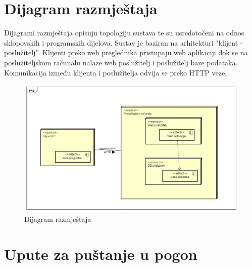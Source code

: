 		
		\section{Dijagram razmještaja}
			
			
			
			Dijagrami razmještaja opisuju topologiju sustava te su usredotočeni na odnos sklopovskih i programskih dijelova. Sustav je baziran na arhitekturi "klijent - poslužitelj". Klijenti preko web preglednika pristupaju web aplikaciji dok se na poslužiteljskom računalu nalaze web poslužitelj i poslužitelj baze podataka. Komunikacija između klijenta i poslužitelja odvija se preko HTTP veze.

			\begin{figure} [H]
			    \centering
			    \includegraphics[width=1.0\linewidth]{slike/Deployment_Diagram.png}
                \caption{Dijagram razmještaja}
                \label{fig:Dijagram razmještaja}
		    \end{figure}
			\eject
		

		\section{Upute za puštanje u pogon}
		
		
			
